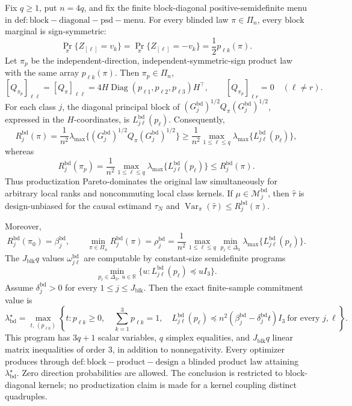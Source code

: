 Fix \(q\ge1\), put \(n=4q\), and fix the finite block-diagonal positive-semidefinite menu in \(\mathrm{def:block-diagonal-psd-menu}\).  For every blinded law \(\pi\in\Pi_n\), every block marginal is sign-symmetric:
\[
\Pr_\pi\{Z_{[\ell]}=v_k\}
=\Pr_\pi\{Z_{[\ell]}=-v_k\}
=\frac12p_{\ell k}(\pi).
\]
Let \(\pi_p\) be the independent-direction, independent-symmetric-sign product law with the same array \(p_{\ell k}(\pi)\). Then \(\pi_p\in\Pi_n\),
\[
[Q_{\pi_p}]_{\ell\ell}=[Q_\pi]_{\ell\ell}
=4H\operatorname{Diag}(p_{\ell1},p_{\ell2},p_{\ell3})H^\top,
\qquad
[Q_{\pi_p}]_{\ell r}=0\quad(\ell\ne r).
\]
For each class \(j\), the diagonal principal block of \((G_j^{\mathrm{bd}})^{1/2}Q_\pi(G_j^{\mathrm{bd}})^{1/2}\), expressed in the \(H\)-coordinates, is \(L^{\mathrm{bd}}_{j\ell}(p_\ell)\). Consequently,
\[
R_j^{\mathrm{bd}}(\pi)
=\frac1{n^2}\lambda_{\max}\{(G_j^{\mathrm{bd}})^{1/2}Q_\pi(G_j^{\mathrm{bd}})^{1/2}\}
\ge\frac1{n^2}\max_{1\le\ell\le q}\lambda_{\max}\{L^{\mathrm{bd}}_{j\ell}(p_\ell)\},
\]
whereas
\[
R_j^{\mathrm{bd}}(\pi_p)
=\frac1{n^2}\max_{1\le\ell\le q}\lambda_{\max}\{L^{\mathrm{bd}}_{j\ell}(p_\ell)\}
\le R_j^{\mathrm{bd}}(\pi).
\]
Thus productization Pareto-dominates the original law simultaneously for arbitrary local ranks and noncommuting local class kernels.  If \(\mu\in\mathcal M_j^{\mathrm{bd}}\), then \(\widehat\tau\) is design-unbiased for the causal estimand \(\tau_N\) and \(\operatorname{Var}_\pi(\widehat\tau)\le R_j^{\mathrm{bd}}(\pi)\).

Moreover,
\[
R_j^{\mathrm{bd}}(\pi_0)=\beta_j^{\mathrm{bd}},
\qquad
\min_{\pi\in\Pi_n}R_j^{\mathrm{bd}}(\pi)
=\rho_j^{\mathrm{bd}}
=\frac1{n^2}\max_{1\le\ell\le q}
\min_{p_\ell\in\Delta_3}\lambda_{\max}\{L^{\mathrm{bd}}_{j\ell}(p_\ell)\}.
\]
The \(J_{\mathrm{blk}}q\) values \(\omega^{\mathrm{bd}}_{j\ell}\) are computable by constant-size semidefinite programs
\[
\min_{p_\ell\in\Delta_3,\ u\in\mathbb R}
\{u:L^{\mathrm{bd}}_{j\ell}(p_\ell)\preceq uI_3\}.
\]
Assume \(\delta_j^{\mathrm{bd}}>0\) for every \(1\le j\le J_{\mathrm{blk}}\). Then the exact finite-sample commitment value is
\[
\boxed{
\lambda_{\mathrm{bd}}^\star
=\max_{t,\,(p_{\ell k})}
\left\{t:
p_{\ell k}\ge0,\quad
\sum_{k=1}^3p_{\ell k}=1,\quad
L^{\mathrm{bd}}_{j\ell}(p_\ell)
\preceq n^2(\beta_j^{\mathrm{bd}}-\delta_j^{\mathrm{bd}}t)I_3
\ \text{for every }j,\ell
\right\}.}
\]
This program has \(3q+1\) scalar variables, \(q\) simplex equalities, and \(J_{\mathrm{blk}}q\) linear matrix inequalities of order \(3\), in addition to nonnegativity. Every optimizer produces through \(\mathrm{def:block-product-design}\) a blinded product law attaining \(\lambda_{\mathrm{bd}}^\star\). Zero direction probabilities are allowed. The conclusion is restricted to block-diagonal kernels; no productization claim is made for a kernel coupling distinct quadruples.